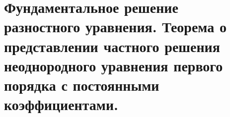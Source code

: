 \section{Фундаментальное решение разностного уравнения. Теорема о представлении частного решения неоднородного уравнения первого порядка с постоянными коэффициентами.}
